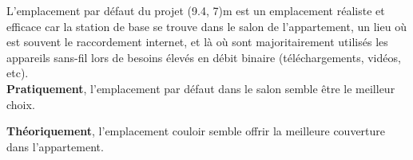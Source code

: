 L'emplacement par défaut du projet (9.4, 7)m est un emplacement réaliste et efficace car la station de base se trouve dans le salon de l'appartement, un lieu où est souvent le raccordement internet, et là où sont majoritairement utilisés les appareils sans-fil lors de besoins élevés en débit binaire (téléchargements, vidéos, etc).\\

\textbf{Pratiquement}, l'emplacement par défaut dans le salon semble être le meilleur choix.

\textbf{Théoriquement}, l'emplacement couloir semble offrir la meilleure couverture dans l'appartement.\\
